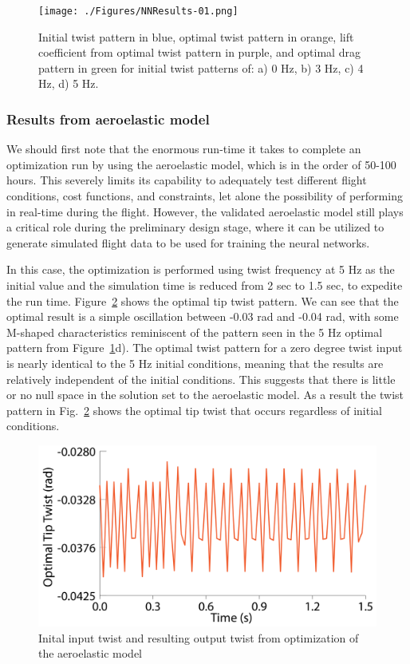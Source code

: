 \documentclass[11pt]{ucthesis}
\begin{document}
\begin{figure}[thpb]
\centering
\texttt{[image: ./Figures/NNResults-01.png]}
\caption{Initial twist pattern in blue, optimal twist pattern in orange, lift coefficient from optimal twist pattern in purple, and optimal drag pattern in green for initial twist patterns of: a) 0 Hz, b) 3 Hz, c) 4 Hz, d) 5 Hz.}
\label{fig:NNResults}
\end{figure}

\subsubsection{Results from aeroelastic model}
We should first note that the enormous run-time it takes to complete an optimization run by using the aeroelastic model, which is in the order of 50-100 hours. This severely limits its capability to adequately test different flight conditions, cost functions, and constraints, let alone the possibility of performing in real-time during the flight. However, the validated aeroelastic model still plays a critical role during the preliminary design stage, where it can be utilized to generate simulated flight data to be used for training the neural networks.   

In this case, the optimization is performed using twist frequency at 5 Hz as the initial value and the simulation time is reduced from 2 sec to 1.5 sec, to expedite the run time. Figure~\ref{fig:AeroTwist} shows the optimal tip twist pattern. We can see that the optimal result is a simple oscillation between -0.03 rad and -0.04 rad, with some M-shaped characteristics reminiscent of the pattern seen in the 5 Hz optimal pattern from Figure~\ref{fig:NNResults}d). The optimal twist pattern for a zero degree twist input is nearly identical to the 5 Hz initial conditions, meaning that the results are relatively independent of the initial conditions. This suggests that there is little or no null space in the solution set to the aeroelastic model. As a result the twist pattern in Fig.~\ref{fig:AeroTwist} shows the optimal tip twist that occurs regardless of initial conditions.

\begin{figure}[thpb]
\centering
\includegraphics[width=1\linewidth]{./Figures/AeroOptimalTwist-01.png}
\caption{Inital input twist and resulting output twist from optimization of the aeroelastic model}
\label{fig:AeroTwist}
\end{figure}
\end{document}
